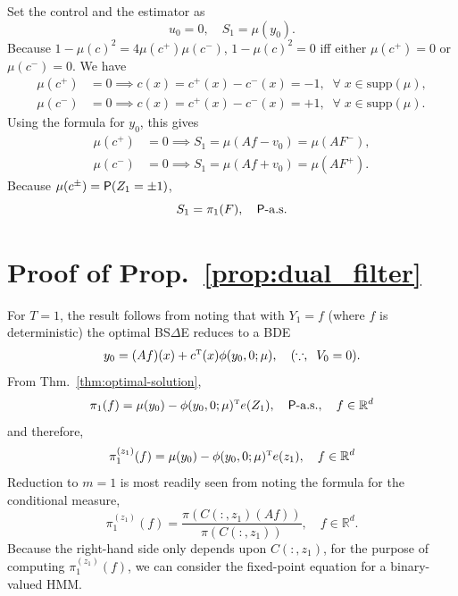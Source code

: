 \documentclass[twoside,11pt]{article}
\def\Re{\mathbb{R}}
\newcommand{\field}[1]{\mathbb{#1}}
\def\Re{\field{R}}
\newcommand{\newP}[1]{\medskip\noindent{\bf #1:}}
\def\Re{\mathbb{R}}
\def\Thm#1{Thm.~\ref{#1}}
\def\Prop#1{Prop.~\ref{#1}}
\renewcommand{\Re}{\mathbb{R}}
\def\sP{{\sf P}}
\def\tp{{\hbox{\rm\tiny T}}}
\begin{document}
\newP{$\bullet$ Case where $\mu(r) = 0$} Set the control and
the estimator as 
\[
u_0 = 0,\quad S_1 = \mu(y_0).
\]
Because $1-\mu(c)^2 = 4 \mu(c^+) \mu(c^-)$, $1-\mu(c)^2 = 0$ iff
either $\mu(c^+) =0$ or $\mu(c^-)=0$.  We have
\begin{align*}
\mu(c^+) &= 0 \implies c(x) = c^+(x) - c^{-}(x) = -1,
  \;\;\forall\;x\in\text{supp}(\mu),\\
\mu(c^-) &= 0 \implies c(x) = c^+(x) - c^{-}(x) = +1,
  \;\;\forall\;x\in\text{supp}(\mu).
\end{align*}
Using the formula for $y_0$, this gives
\begin{align*}
\mu(c^+) &= 0 \implies S_1 = \mu(Af - v_0) = \mu(AF^{-}),\\
\mu(c^-) &= 0 \implies S_1 = \mu(Af + v_0) = \mu(AF^{+}).
\end{align*}
Because $\mu(c^\pm) = \sP(Z_1=\pm1)$,
\[
S_1 = \pi_1(F),\quad \sP\text{-a.s.}
\]


\section{Proof of \Prop{prop:dual_filter}}
\label{appdx:prop_dual_filter}

For $T=1$, the result follows from noting that with $Y_1=f$ (where $f$
is deterministic) the optimal BS$\Delta$E reduces to a BDE
\begin{equation*}
y_0 = (Af)(x) + c^\tp(x)  \phi(y_0,0;\mu),\quad (\because,\;\;V_0=0).
\end{equation*}
From \Thm{thm:optimal-solution},
\begin{equation*}
\pi_1(f) = \mu(y_0) - \phi(y_0,0;\mu)^\tp e(Z_1),\quad
\sP\text{-a.s.}, \quad f\in\Re^d
\end{equation*}
and therefore,
\begin{equation*}
\pi_1^{(z_1)}(f) = \mu(y_0) - \phi(y_0,0;\mu)^\tp e(z_1),\quad f\in\Re^d
\end{equation*}
Reduction to $m=1$ is
most readily seen from noting the formula for the conditional measure,
\begin{equation*}
\pi_1^{(z_1)}(f) = \frac{\pi(C(:,z_1) (Af))}{\pi(C(:,z_1))},\quad f\in \Re^d.
\end{equation*}
Because the right-hand side only depends upon $C(:,z_1)$, for the
purpose of computing $\pi_1^{(z_1)}(f)$, we can 
consider the fixed-point equation for a binary-valued HMM.  


\end{document}
